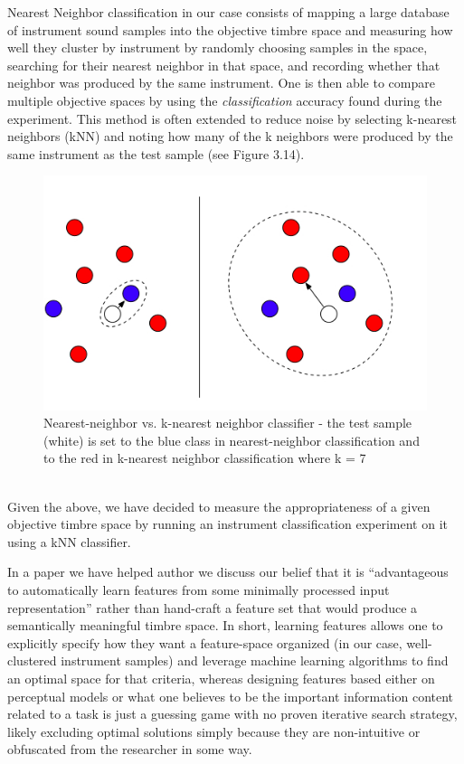 \documentclass[a4paper,12pt]{report} 	%
\numberwithin{figure}{chapter}
\numberwithin{table}{chapter}
\numberwithin{equation}{chapter}
\begin{document}
\begin{flushleft}
Nearest Neighbor classification in our case consists of mapping a large database of instrument sound samples into the objective timbre space and measuring how well they cluster by instrument by randomly choosing samples in the space, searching for their nearest neighbor in that space, and recording whether that neighbor was produced by the same instrument. One is then able to compare multiple objective spaces by using the \emph{classification} accuracy found during the experiment. This method is often extended to reduce noise by selecting k-nearest neighbors (kNN) and noting how many of the k neighbors were produced by the same instrument as the test sample (see Figure 3.14).
\begin{figure}[h!]
\begin{center}
\includegraphics[scale=0.5]{NearestNeighbor}
\caption[Nearest-neighbor vs. k-nearest neighbor classifier]{Nearest-neighbor vs. k-nearest neighbor classifier - the test sample (white) is set to the blue class in nearest-neighbor classification and to the red in k-nearest neighbor classification where k = 7}
\end{center}
\end{figure}
\\
Given the above, we have decided to measure the appropriateness of a given objective timbre space by running an instrument classification experiment on it using a kNN classifier.

In a paper we have helped author \cite{Humphrey:2000th} we discuss our belief that it is ``advantageous to automatically learn features from some minimally processed input representation'' rather than hand-craft a feature set that would produce a semantically meaningful timbre space. In short, learning features allows one to explicitly specify how they want a feature-space organized (in our case, well-clustered instrument samples) and leverage machine learning algorithms to find an optimal space for that criteria, whereas designing features based either on perceptual models or what one believes to be the important information content related to a task is just a guessing game with no proven iterative search strategy, likely excluding optimal solutions simply because they are non-intuitive or obfuscated from the researcher in some way.


\end{flushleft}
\end{document}
